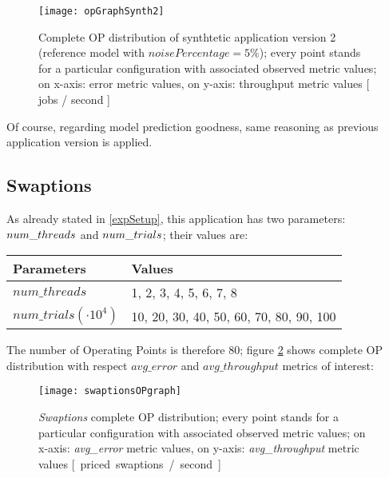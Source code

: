 \begin{figure}[H]

    \centering
    \texttt{[image: opGraphSynth2]}
    \caption{Complete OP distribution of synthtetic application version 2 (reference model with $noisePercentage = 5\%$); every point stands for a particular configuration with associated observed metric values; on x-axis: error metric values, on y-axis: throughput metric values [ jobs / second ]}
    \label{fig::opListSynth2}
    
\end{figure}

Of course, regarding model prediction goodness, same reasoning as previous application version is applied.


\subsection{Swaptions}

As already stated in \ref{expSetup}, this application has two parameters: $num\_\-threads$ and $num\_\-trials$; their values are:

\begin{center}

    \begin{tabular}{ll}
    
        \toprule
        Parameters & Values \\
        \midrule
        $num\_threads$ & 1, 2, 3, 4, 5, 6, 7, 8 \\
        $num\_trials (\cdot 10^4)$ & 10, 20, 30, 40, 50, 60, 70, 80, 90, 100 \\
        \bottomrule 
    
    \end{tabular}

\end{center}

The number of Operating Points is therefore 80; figure \ref{fig::swaptionsOPs} shows complete OP distribution with respect $avg\_error$ and $avg\_throughput$ metrics of interest:

\begin{figure}[H]

    \centering
    \texttt{[image: swaptionsOPgraph]}
    \caption{\textit{Swaptions} complete OP distribution; every point stands for a particular configuration with associated observed metric values; on x-axis: \textit{avg\_error} metric values, on y-axis: \textit{avg\_throughput} metric values \hbox{[ priced swaptions / second ]}}
    \label{fig::swaptionsOPs}
    
\end{figure}





